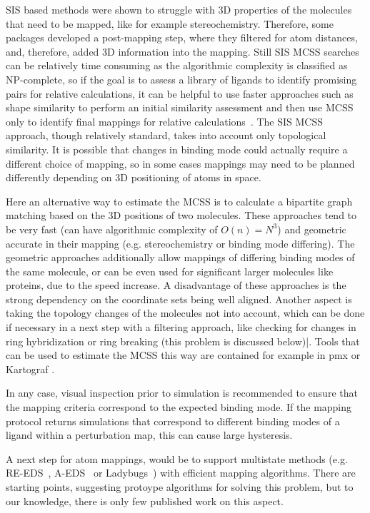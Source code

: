 \documentclass[9pt,bestpractices]{livecoms}
\begin{document}
SIS based methods were shown to struggle with 3D properties of the molecules that need to be mapped, like for example stereochemistry. Therefore, some packages developed a post-mapping step, where they filtered for atom distances, and, therefore, added 3D information into the mapping.
Still SIS MCSS searches can be relatively time consuming as the algorithmic complexity is classified as NP-complete, so if the goal is to assess a library of ligands to identify promising pairs for relative calculations, it can be helpful to use faster approaches such as shape similarity to perform an initial similarity assessment and then use MCSS only to identify final mappings for relative calculations~\cite{raymond2002maximum,klabunde2012mars,jones2009elucidating, Duesbury2018Comparison}. The SIS MCSS approach, though relatively standard, takes into account only topological similarity. It is possible that changes in binding mode could actually require a different choice of mapping, so in some cases mappings may need to be planned differently depending on 3D positioning of atoms in space. 

Here an alternative way to estimate the MCSS is to calculate a bipartite graph matching based on the 3D positions of two molecules. These approaches tend to be very fast (can have algorithmic complexity of $O(n)=N^3$) and geometric accurate in their mapping (e.g. stereochemistry or binding mode differing).
The geometric approaches additionally allow mappings of differing binding modes of the same molecule, or can be even used for significant larger molecules like proteins, due to the speed increase.
A disadvantage of these approaches is the strong dependency on the coordinate sets being well aligned. Another aspect is taking the topology changes of the molecules not into account, which can be done if necessary in a next step with a filtering approach, like checking for changes in ring hybridization or ring breaking (this problem is discussed below)|.
Tools that can be used to estimate the MCSS this way are contained for example in pmx \cite{gapsys2015pmx} or Kartograf \cite{ries2024kartograf}.

In any case, visual inspection prior to simulation is recommended to ensure that the mapping criteria correspond to the expected binding mode. If the mapping protocol returns simulations that correspond to different binding modes of a ligand within a perturbation map, this can cause large hysteresis.

A next step for atom mappings, would be to support multistate methods (e.g. RE-EDS~\cite{sidler2016replica}, A-EDS~\cite{perthold2020toward} or Ladybugs~\cite{robo2023fast}) with efficient mapping algorithms. There are starting points, suggesting protoype algorithms for solving this problem, but to our knowledge, there is only few published work on this aspect. \cite{petrov2021perturbation}
\end{document}
